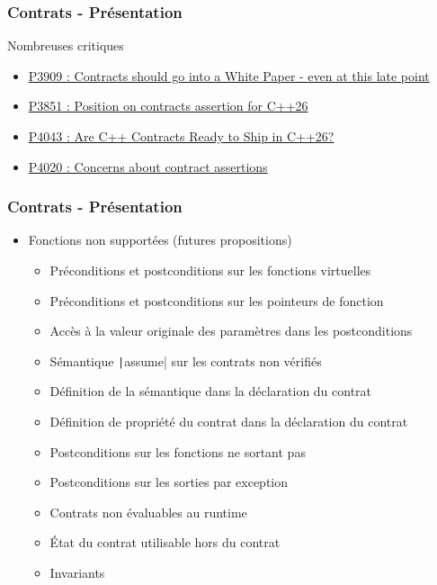 \documentclass[C++.tex]{subfiles}
\begin{document}
\begin{frame}[fragile]
	\frametitle{Contrats - Présentation}
	\begin{alertblock}{Nombreuses critiques}
		\begin{itemize}
			\item \href{https://wg21.link/p3909}{P3909 : Contracts should go into a White Paper - even at this late point}
			\item \href{https://wg21.link/p3851}{P3851 : Position on contracts assertion for C++26}
			\item \href{https://wg21.link/P4043}{P4043 : Are C++ Contracts Ready to Ship in C++26?}
			\item \href{https://wg21.link/p4020}{P4020 : Concerns about contract assertions}
		\end{itemize}

\end{alertblock}

\end{frame}

\begin{frame}[fragile]
	\frametitle{Contrats - Présentation}
	\begin{itemize}
		\item Fonctions non supportées (futures propositions)
		\begin{itemize}
			\item Préconditions et postconditions sur les fonctions virtuelles
			\item Préconditions et postconditions sur les pointeurs de fonction
			\item Accès à la valeur originale des paramètres dans les postconditions
			\item Sémantique \texttt|assume| sur les contrats non vérifiés


			\item Définition de la sémantique dans la déclaration du contrat
			\item Définition de propriété du contrat dans la déclaration du contrat
			\item Postconditions sur les fonctions ne sortant pas
			\item Postconditions sur les sorties par exception
			\item Contrats non évaluables au runtime
			\item État du contrat utilisable hors du contrat
			\item Invariants
		\end{itemize}
	\end{itemize}
\end{frame}
\end{document}
